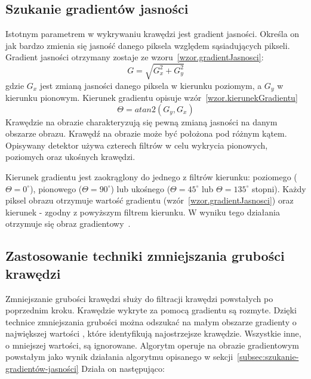 \documentclass[a4paper,twoside,12pt]{book}
\begin{document}
    \subsection*{Szukanie gradientów jasności}\label{subsec:szukanie-gradientów-jasności}
    Istotnym parametrem w wykrywaniu krawędzi jest gradient jasności.
    Określa on jak bardzo zmienia się jasność danego piksela względem sąsiadujących pikseli.
    Gradient jasności otrzymany zostaje ze wzoru~\ref{wzor.gradientJasnosci}:
    \large
    \begin{equation}
        G = \sqrt{G_{x}^{2} + G_{y}^{2}}
        \label{wzor.gradientJasnosci}
    \end{equation}
    \normalsize
    gdzie $G_{x}$ jest zmianą jasności danego piksela w kierunku poziomym, a $G_{y}$ w kierunku pionowym.
    Kierunek gradientu opisuje wzór~\ref{wzor.kierunekGradientu}
    \large
    \begin{equation}
        \Theta = atan2(G_{y}, G_{x})
        \label{wzor.kierunekGradientu}
    \end{equation}
    \normalsize
    Krawędzie na obrazie charakteryzują się pewną zmianą jasności na danym obszarze obrazu.
    Krawędź na obrazie może być położona pod różnym kątem.
    Opisywany detektor używa czterech filtrów w celu wykrycia pionowych, poziomych oraz ukośnych krawędzi.

    Kierunek gradientu jest zaokrąglony do jednego z filtrów kierunku: poziomego ($\Theta = 0^{\circ}$),
    pionowego ($\Theta = 90^{\circ}$) lub ukośnego ($\Theta = 45^{\circ}$
    lub $\Theta = 135^{\circ}$ stopni).
    Każdy piksel obrazu otrzymuje wartość gradientu (wzór~\ref{wzor.gradientJasnosci})
    oraz kierunek - zgodny z powyższym filtrem kierunku.
    W wyniku tego działania otrzymuje się obraz gradientowy~\cite{Canny}.
    \subsection*{Zastosowanie techniki zmniejszania grubości
    krawędzi}\label{subsec:zastosowanie-zmniejszania-grubości-krawędzi}
    Zmniejszanie grubości krawędzi służy do filtracji krawędzi powstałych po poprzednim kroku.
    Krawędzie wykryte za pomocą gradientu są rozmyte.
    Dzięki technice zmniejszania grubości można odszukać na małym obszarze gradienty o największej wartości
    , które identyfikują najostrzejsze krawędzie.
    Wszystkie inne, o mniejszej wartości, są ignorowane.
    Algorytm operuje na obrazie gradientowym powstałym jako wynik działania algorytmu opisanego w sekcji~\ref{subsec:szukanie-gradientów-jasności}
    Działa on następująco:
\end{document}
